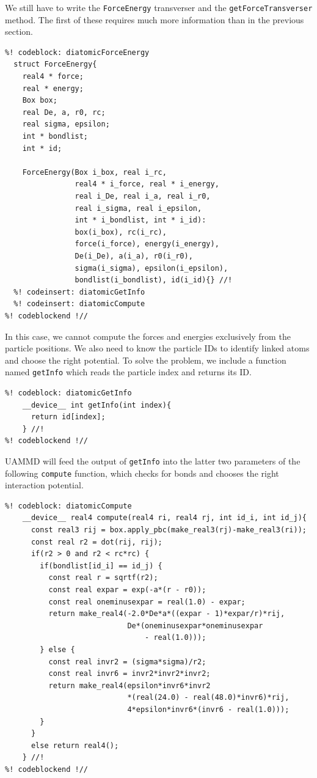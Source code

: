 We still have to write the \texttt{ForceEnergy} transverser and the 
\texttt{getForceTransverser} method. The first of these requires much more 
information than in the previous section.
\begin{lstlisting}
%! codeblock: diatomicForceEnergy
  struct ForceEnergy{
    real4 * force;
    real * energy;
    Box box;
    real De, a, r0, rc;
    real sigma, epsilon;
    int * bondlist;
    int * id;

    ForceEnergy(Box i_box, real i_rc,
                real4 * i_force, real * i_energy,
                real i_De, real i_a, real i_r0,
                real i_sigma, real i_epsilon,
                int * i_bondlist, int * i_id):
                box(i_box), rc(i_rc),
                force(i_force), energy(i_energy),
                De(i_De), a(i_a), r0(i_r0),
                sigma(i_sigma), epsilon(i_epsilon),
                bondlist(i_bondlist), id(i_id){} //!
  %! codeinsert: diatomicGetInfo
  %! codeinsert: diatomicCompute
%! codeblockend !//
\end{lstlisting}
In this case, we cannot compute the forces and energies exclusively from the 
particle positions. We also need to know the particle IDs to identify linked
atoms and choose the right potential. To solve the problem, we include a 
function named \texttt{getInfo} which reads the particle index and returns its 
ID.
\begin{lstlisting}
%! codeblock: diatomicGetInfo
    __device__ int getInfo(int index){
      return id[index];
    } //!
%! codeblockend !//
\end{lstlisting}
UAMMD will feed the output of \texttt{getInfo} into the latter two parameters of 
the following \texttt{compute} function, which checks for bonds and chooses the 
right interaction potential.
\begin{lstlisting}
%! codeblock: diatomicCompute
    __device__ real4 compute(real4 ri, real4 rj, int id_i, int id_j){
      const real3 rij = box.apply_pbc(make_real3(rj)-make_real3(ri));
      const real r2 = dot(rij, rij);
      if(r2 > 0 and r2 < rc*rc) {
        if(bondlist[id_i] == id_j) {
          const real r = sqrtf(r2);
          const real expar = exp(-a*(r - r0));
          const real oneminusexpar = real(1.0) - expar;
          return make_real4(-2.0*De*a*((expar - 1)*expar/r)*rij,
                            De*(oneminusexpar*oneminusexpar
                                - real(1.0)));
        } else {
          const real invr2 = (sigma*sigma)/r2;
          const real invr6 = invr2*invr2*invr2;
          return make_real4(epsilon*invr6*invr2
                            *(real(24.0) - real(48.0)*invr6)*rij,
                            4*epsilon*invr6*(invr6 - real(1.0)));
        }
      }
      else return real4();
    } //!
%! codeblockend !//
\end{lstlisting}
